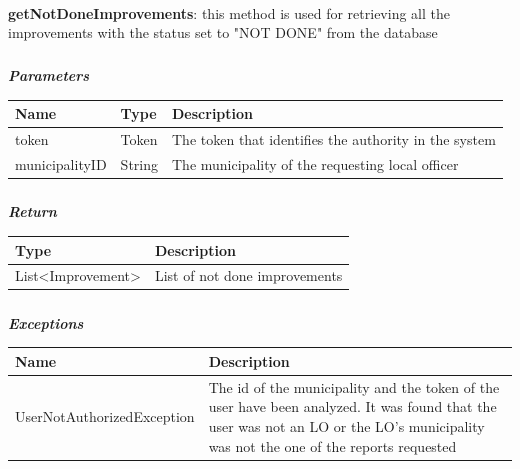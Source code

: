 					\paragraph{}
							\textbf{getNotDoneImprovements}: this method is used for retrieving all the improvements with the status set to "NOT DONE" from the database
							\subparagraph{}
							\textit{\textbf{Parameters}}
								\begin{table}[!h]
									\begin{tabular}{L{0.2\textwidth}L{0.2\textwidth}L{0.2\textwidth}}
										\toprule
										Name & Type & Description \\
										\midrule
								  		token & Token & The token that identifies the authority in the system \\
municipalityID & String & The municipality of the requesting local officer \\
								 		\bottomrule
									\end{tabular}
								\end{table}
							\subparagraph{}
								\textit{\textbf{Return}}
									\begin{table}[!h]
									\begin{tabular}{L{0.3\textwidth}L{0.3\textwidth}}
										\toprule
										Type & Description \\
										\midrule
								  		List<Improvement> & List of not done improvements \\
								 		\bottomrule
									\end{tabular}
								\end{table}
							\subparagraph{}
								\textit{\textbf{Exceptions}}
									\begin{table}[!h]
									\begin{tabular}{L{0.3\textwidth}L{0.3\textwidth}}
										\toprule
										Name & Description \\
										\midrule
								  		UserNotAuthorizedException & The id of the municipality and the token of the user have been analyzed. It was found that the user was not an LO or the LO's  municipality was not the one of the reports requested  \\
								 		\bottomrule
									\end{tabular}
								\end{table}
					
